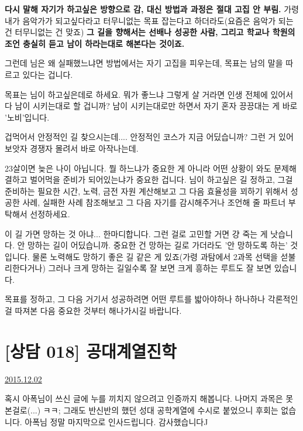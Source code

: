 \textbf{다시 말해 자기가 하고싶은 방향으로 감, 대신 방법과 과정은 절대 고집 안 부림.}
가령 내가 음악가가 되고싶다라고 터무니없는 목표 잡는다고 하더라도(요즘은 음악가 되는 건 터무니없는 건 맞죠)
\textbf{그 길을 향해서는 선배나 성공한 사람, 그리고 학교나 학원의 조언 충실히 듣고 남이 하라는대로 해본다는 것이죠.}
\vspace{5mm}

그런데 님은 왜 실패했느냐면
방법에서는 자기 고집을 피우는데, 목표는 남의 말을 따르고 있다는 겁니다.
\vspace{5mm}

목표는 님이 하고싶은데로 하세요. 뭐가 좋느냐 그렇게 살 거라면
인생 전체에 있어서 다 남이 시키는대로 할 겁니까?
남이 시키는대로만 하면서 자기 혼자 끙끙대는 게 바로 '노비'입니다.
\vspace{5mm}

겁먹어서 안정적인 길 찾으시는데.... 안정적인 코스가 지금 어딨습니까? 그런 거 있어보앗자 경쟁자 몰려서 바로 아작나는데.
\vspace{5mm}

23살이면 늦은 나이 아닙니다. 뭘 하느냐가 중요한 게 아니라 어떤 상황이 와도 문제해결하고 벌어먹을 준비가 되어있는냐가 중요한 겁니다.
님이 하고싶은 길 정하고, 그걸 준비하는 필요한 시간, 노력, 금전 자원 계산해보고
그 다음 효율성을 꾀하기 위해서 성공한 사례, 실패한 사례 참조해보고 그 다음 자기를 감시해주거나 조언해 줄 파트너 부탁해서 선정하세요.
\vspace{5mm}

이 길 가면 망하는 것 아냐... 한마디합니다. 그런 걸로 고민할 거면 걍 죽는 게 낫습니다.
안 망하는 길이 어딨습니까.
중요한 건 망하는 길로 가더라도 '안 망하도록 하는' 것입니다.
물론 노력해도 망하기 좋은 길 같은 게 있죠(가령 과탐에서 2과목 선택을 섣불리한다거나)
그러나 크게 망하는 길일수록 잘 보면 크게 흥하는 루트도 잘 보면 있습니다.
\vspace{5mm}

목표를 정하고, 그 다음 거기서 성공하려면 어떤 루트를 밟아야하나 하나하나 각론적인 걸 따져본 다음
중요한 것부터 해나가시길 바랍니다.
\vspace{5mm}




\section{[상담 018] 공대계열진학}
\href{https://www.kockoc.com/Apoc/524419}{2015.12.02}

\vspace{5mm}

혹시 아폭님이 쓰신 글에 누를 끼치지 않으려고 인증까지 해봅니다. 나머지 과목은 못본걸로(...) ㅋㅋ;
그래도 반신반의 했던 성대 공학계열에 수시로 붙었으니 후회는 없습니다. 아폭님 정말 마지막으로 인사드립니다. 감사했습니다^^
\vspace{5mm}

